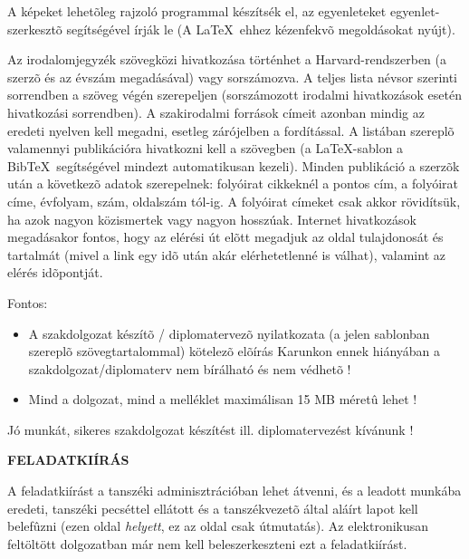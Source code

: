 A képeket lehetõleg rajzoló programmal készítsék el, az egyenleteket egyenlet-szerkesztõ segítségével írják le (A \LaTeX~ehhez kézenfekvõ megoldásokat nyújt).

Az irodalomjegyzék szövegközi hivatkozása történhet a Harvard-rendszerben (a szerzõ és az évszám megadásával) vagy sorszámozva. A teljes lista névsor szerinti sorrendben a szöveg végén szerepeljen (sorszámozott irodalmi hivatkozások esetén hivatkozási sorrendben). A szakirodalmi források címeit azonban mindig az eredeti nyelven kell megadni, esetleg zárójelben a fordítással. A listában szereplõ valamennyi publikációra hivatkozni kell a szövegben (a \LaTeX-sablon a Bib\TeX~segítségével mindezt automatikusan kezeli). Minden publikáció a szerzõk után a következõ adatok szerepelnek: folyóirat cikkeknél a pontos cím, a folyóirat címe, évfolyam, szám, oldalszám tól-ig. A folyóirat címeket csak akkor rövidítsük, ha azok nagyon közismertek vagy nagyon hosszúak. Internet hivatkozások megadásakor fontos, hogy az elérési út elõtt megadjuk az oldal tulajdonosát és tartalmát (mivel a link egy idõ után akár elérhetetlenné is válhat), valamint az elérés idõpontját.

\vspace{5mm}
Fontos:
\begin{itemize}
	\item A szakdolgozat készítõ / diplomatervezõ nyilatkozata (a jelen sablonban szereplõ szövegtartalommal) kötelezõ elõírás Karunkon ennek hiányában a szakdolgozat/diplomaterv nem bírálható és nem védhetõ !
	\item Mind a dolgozat, mind a melléklet maximálisan 15 MB méretû lehet !
\end{itemize}

\vspace{5mm}
\begin{center}
Jó munkát, sikeres szakdolgozat készítést ill. diplomatervezést kívánunk !
\end{center}

\normalsize

\clearpage
\begin{center}
\large
\textbf{FELADATKIÍRÁS}\\
\end{center}

A feladatkiírást a tanszéki adminisztrációban lehet átvenni, és a leadott munkába eredeti, tanszéki pecséttel ellátott és a tanszékvezetõ által aláírt lapot kell belefûzni (ezen oldal \emph{helyett}, ez az oldal csak útmutatás). Az elektronikusan feltöltött dolgozatban már nem kell beleszerkeszteni ezt a feladatkiírást.

\begin{flushright}
 \vspace*{1cm}
 \makebox[7cm]{\rule{6cm}{.4pt}}\\
 \\
\end{flushright}
\vfill



